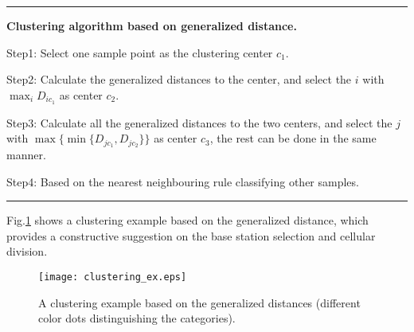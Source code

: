 \documentclass[journal,12pt,draftclsnofoot,onecolumn]{IEEEtran}
\begin{document}
\noindent\rule[0.25\baselineskip]{0.49\textwidth}{1pt}

\noindent \textbf{Clustering algorithm based on generalized distance.}

\noindent Step1: Select one sample point as the clustering center $c_{1}$.

\noindent Step2: Calculate the generalized distances to the center, and select the $i$ with $\max_{i} D_{ic_{1}}$ as center $c_{2}$.

\noindent Step3: Calculate all the generalized distances to the two centers, and select the $j$ with $\max \{\min \{{{D}_{j{{c}_{1}}}},{{D}_{j{{c}_{2}}}}\}\}$ as center $c_{3}$, the rest can be done in the same manner.

\noindent Step4: Based on the nearest neighbouring rule classifying other samples.

\noindent\rule[0.25\baselineskip]{0.49\textwidth}{1pt}

Fig.\ref{clustering_ex} shows a clustering example based on the generalized distance, which provides a constructive suggestion on the base station selection and cellular division.

\begin{figure}
  \centering
  \texttt{[image: clustering\_ex.eps]}\\
  \caption{A clustering example based on the generalized distances (different color dots distinguishing the categories).}\label{clustering_ex}
  \vspace{-4mm}
\end{figure}
\end{document}
